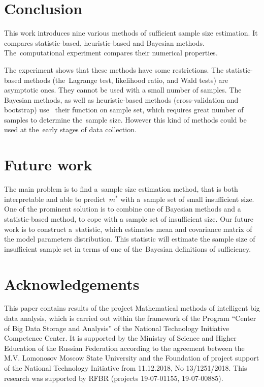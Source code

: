 \documentclass[
11pt,%
tightenlines,%
twoside,%
onecolumn,%
nofloats,%
nobibnotes,%
nofootinbib,%
superscriptaddress,%
noshowpacs,%
centertags]%
{revtex4}
\begin{document}
\section{Conclusion}
This work introduces nine various methods of sufficient sample size estimation. It compares statistic-based, heuristic-based and  Bayesian methods. The~computational experiment compares their numerical properties.

The  experiment shows that  these methods have some restrictions. The statistic-based methods (the~Lagrange test, likelihood ratio, and Wald tests) are asymptotic ones. They cannot be used with a small number of samples. The Bayesian methods, as well as heuristic-based methods (cross-validation and bootstrap) use~ their function on sample set, which requires great number of samples to determine the~sample size. However this kind of methods could be used at the~early stages of data collection.

\section{Future work}
The main problem is to find a~sample size estimation method, that is both interpretable and able to predict~$m^*$ with a~sample set of small insufficient size. One of the prominent solution is to combine one of Bayesian methods  and a statistic-based method, to cope with a sample set of insufficient size.  Our future work is to construct a~statistic, which estimates mean and covariance matrix of the model parameters distribution. This statistic will estimate the sample size of insufficient sample set in terms of one of the~Bayesian definitions of sufficiency. 

\section*{Acknowledgements}
This paper contains results of the project Mathematical methods of intelligent big data analysis, which is carried out within the framework of the Program ``Center of Big Data Storage and Analysis'' of the National Technology Initiative Competence Center. It is supported by the Ministry of Science and Higher Education of the Russian Federation according to the agreement between the M.V. Lomonosov Moscow State University and the Foundation of project support of the National Technology Initiative from 11.12.2018, No 13/1251/2018. This research was supported by RFBR (projects 19-07-01155, 19-07-00885).
\end{document}
